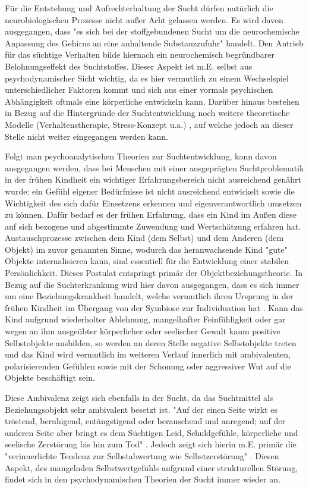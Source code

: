 Für die Entstehung und Aufrechterhaltung der Sucht dürfen natürlich die neurobiologischen Prozesse nicht außer Acht gelassen werden. Es wird davon ausgegangen, dass "es sich bei der stoffgebundenen Sucht um die neurochemische Anpassung des Gehirns an eine anhaltende Substanzzufuhr" \autocite[14]{tretter2008} handelt. Den Antrieb für das süchtige Verhalten bilde hiernach ein neurochemisch begründbarer Belohnungseffekt des Suchtstoffes. Dieser Aspekt ist m.E. selbst aus psychodynamischer Sicht wichtig, da es hier vermutlich zu einem Wechselspiel unterschiedlicher Faktoren kommt und sich aus einer vormals psychischen Abhängigkeit oftmals eine körperliche entwickeln kann.
Darüber hinaus bestehen in Bezug auf die Hintergründe der Suchtentwicklung noch weitere theoretische Modelle (Verhaltenstherapie, Stress-Konzept u.a.) \autocite[vgl.][38ff.]{tretter2008}, auf welche jedoch an dieser Stelle nicht weiter eingegangen werden kann.
 
Folgt man psychoanalytischen Theorien zur Suchtentwicklung, kann davon ausgegangen werden, dass bei Menschen mit einer ausgeprägten Suchtproblematik in der frühen Kindheit ein wichtiger Erfahrungsbereich nicht ausreichend genährt wurde: ein Gefühl eigener Bedürfnisse ist nicht ausreichend entwickelt sowie die Wichtigkeit des sich dafür Einsetzens erkennen und eigenverantwortlich umsetzen zu können. Dafür bedarf es der frühen Erfahrung, dass ein Kind im Außen diese auf sich bezogene und abgestimmte Zuwendung und Wertschätzung erfahren hat. Austauschprozesse zwischen dem Kind (dem Selbst) und dem Anderen (dem Objekt) im zuvor genannten Sinne, wodurch das heranwachsende Kind "gute" Objekte internalisieren kann, sind essentiell für die Entwicklung einer stabilen Persönlichkeit. Dieses Postulat entspringt primär der Objektbeziehungstheorie. In Bezug auf die Suchterkrankung wird hier davon ausgegangen, dass es sich immer um eine Beziehungskrankheit handelt, welche vermutlich ihren Ursprung in der frühen Kindheit im Übergang von der Symbiose zur Individuation hat \autocite[vgl.][9]{weidlinger2012}. Kann das Kind aufgrund wiederholter Ablehnung, mangelhafter Feinfühligkeit oder gar wegen an ihm ausgeübter körperlicher oder seelischer Gewalt kaum positive Selbstobjekte ausbilden, so werden an deren Stelle negative Selbstobjekte treten und das Kind wird vermutlich im weiteren Verlauf innerlich mit ambivalenten, polarisierenden Gefühlen sowie mit der Schonung oder aggressiver Wut auf die Objekte beschäftigt sein\autocite[vgl.][10]{weidlinger2012}. 

Diese Ambivalenz zeigt sich ebenfalls in der Sucht, da das Suchtmittel als Beziehungsobjekt sehr ambivalent besetzt ist. "Auf der einen Seite wirkt es tröstend, beruhigend, entängstigend oder berauschend und anregend; auf der anderen Seite aber bringt es dem Süchtigen Leid, Schuldgefühle, körperliche und seelische Zerstörung bis hin zum Tod" \autocite[175]{mentzos2011}. Jedoch zeigt sich hierin m.E. primär die "verinnerlichte Tendenz zur Selbstabwertung wie Selbstzerstörung" \autocite[10]{weidlinger2012}. Diesen Aspekt, des mangelnden Selbstwertgefühls aufgrund einer strukturellen Störung, findet sich in den psychodynamischen Theorien der Sucht immer wieder an. 

